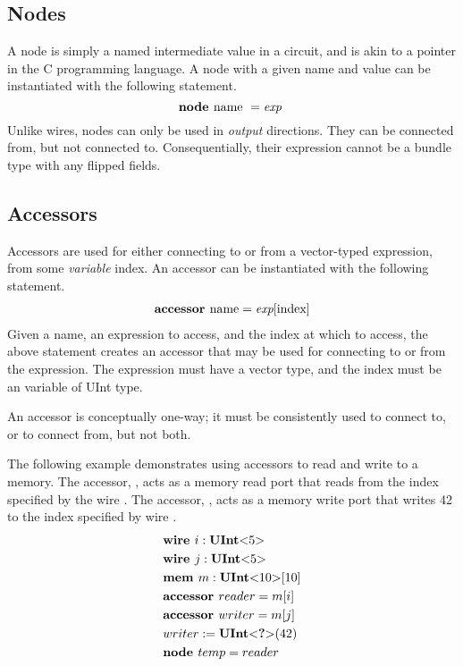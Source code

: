 \documentclass[10pt]{article}
\begin{document}
\subsection{Nodes}
A node is simply a named intermediate value in a circuit, and is akin to a pointer in the C programming language.
A node with a given name and value can be instantiated with the following statement.
\[
\text{\bf node\ } \text{name } = \text{\em exp\ } \\
\]
Unlike wires, nodes can only be used in {\em output} directions.
They can be connected from, but not connected to.
Consequentially, their expression cannot be a bundle type with any flipped fields.

\subsection{Accessors}
Accessors are used for either connecting to or from a vector-typed expression, from some {\em variable} index.
An accessor can be instantiated with the following statement.
\[
\begin{aligned}
&\text{\bf accessor\ } \text{name} = \text{\em exp}[\text{index}] \\
\end{aligned}
\]
Given a name, an expression to access, and the index at which to access, the above statement creates an accessor that may be used for connecting to or from the expression.
The expression must have a vector type, and the index must be an variable of UInt type.

An accessor is conceptually one-way; it must be consistently used to connect to, or to connect from, but not both.

The following example demonstrates using accessors to read and write to a memory.
The accessor, , acts as a memory read port that reads from the index specified by the wire .
The accessor, , acts as a memory write port that writes 42 to the index specified by wire .
\[
\begin{aligned}
&\text{\bf wire\ } i : \text{\bf UInt}\text{\bf $<$} 5 \text{\bf $>$} \\
&\text{\bf wire\ } j : \text{\bf UInt}\text{\bf $<$} 5 \text{\bf $>$} \\
&\text{\bf mem\ } m : \text{\bf UInt}\text{\bf $<$} 10 \text{\bf $>$}[10] \\
&\text{\bf accessor\ } reader = m[i] \\
&\text{\bf accessor\ } writer = m[j] \\
&writer := \text{\bf UInt}\text{\bf $<$} \text{\bf ?} \text{\bf $>$}(42) \\
&\text{\bf node\ } temp = reader \\
\end{aligned}
\]
\end{document}
